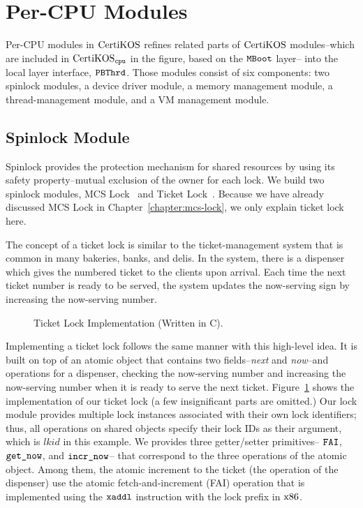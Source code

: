 \section{Per-CPU Modules}
\label{chapter:certikos:sec:per-cpu-modules}

Per-CPU modules in $\mathrm{CertiKOS}$  refines related parts of  $\mathrm{CertiKOS}$ modules--which are included in $\mathrm{CertiKOS}_{{\mathrm{\texttt{cpu}}}}$ in the figure, based on the ${\mathrm{\texttt{MBoot}}}$ layer-- 
into the local layer interface, ${{\mathrm{\texttt{PBThrd}}}}$.
Those modules consist of six components:
two spinlock modules, a device driver module, a memory management module,  a thread-management module, and a VM management module. 

\subsection{Spinlock Module}
\label{chapter:certikos:subsec:spinlock-module}

Spinlock provides the protection mechanism for shared resources by using its safety property--mutual exclusion of the owner for each lock. 
We build two spinlock modules, 
MCS Lock~\cite{mcs91} and Ticket Lock~\cite{lwn:ticketlocks}.
Because we have already discussed MCS Lock in Chapter~\ref{chapter:mcs-lock}, 
we only explain ticket lock here.

The concept of a ticket lock is similar to the ticket-management system that is common in many bakeries, banks, and delis. 
In the system, 
there is a dispenser which gives the numbered ticket to the clients upon arrival. 
Each time the next ticket number is ready to 
be served, 
the system updates the now-serving sign by increasing the now-serving number. 
\begin{figure}
 
\caption{Ticket Lock Implementation (Written in C).}
\label{fig:chapter:certikos:ticket-lock-example}
\end{figure}
Implementing a ticket lock follows the same manner with this high-level idea.
It is built on top of an atomic object that contains two fields--\textit{next} and \textit{now}--and operations for a dispenser, checking the now-serving number and increasing the now-serving number when
it is ready to serve the next ticket. 
Figure~\ref{fig:chapter:certikos:ticket-lock-example} shows the implementation of our ticket lock (a few insignificant parts are omitted.)
Our lock module provides multiple lock instances associated with their own lock identifiers;
thus, all operations on shared objects specify their lock IDs as their argument, which is $lkid$ in this example.
We provides three getter/setter primitives-- ${\mathrm{\texttt{FAI}}}$, ${\mathrm{\texttt{get\_now}}}$, and ${\mathrm{\texttt{incr\_now}}}$--
that correspond to the three operations of the atomic object.
Among them, the atomic increment to the ticket (the operation of the dispenser) 
use the atomic fetch-and-increment (FAI) operation that is implemented using the ${\mathrm{\texttt{xaddl}}}$ instruction with the 
lock prefix in $\mathrm{x86}$.

